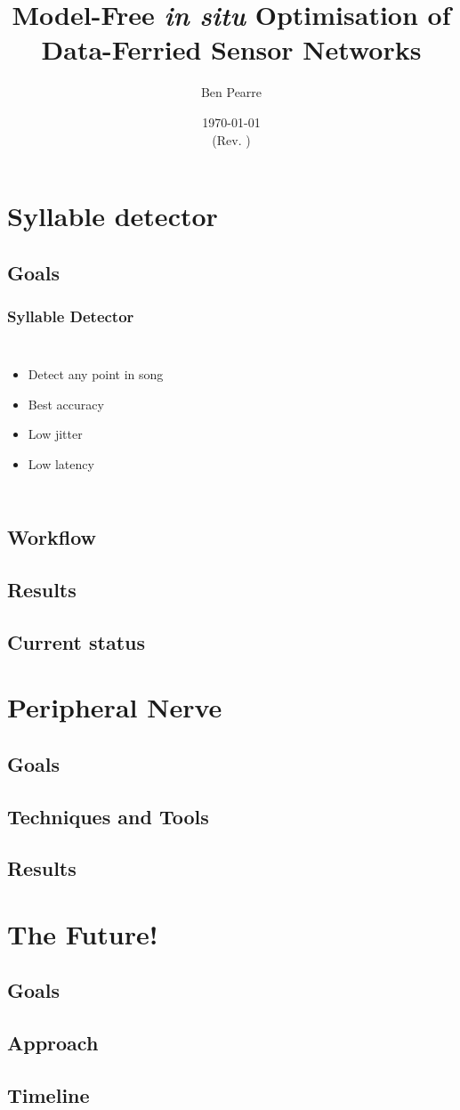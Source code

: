 \documentclass{beamer}
\title[Model-free Policy Optimisation for Data Ferries]{Model-Free {\em in situ\/} Optimisation of \\ Data-Ferried Sensor Networks}
\author{Ben Pearre}
\date{\today\\{\small (Rev. \svnrev)}}
\begin{document}
\begin{frame}
  \titlepage
\end{frame}

\section{Syllable detector}
\subsection{Goals}

\begin{frame}
\frametitle{Syllable Detector}
    \begin{columns}
	\column{5cm}
	\column{50mm}
	\begin{itemize}
	\item Detect any point in song
    	\item Best accuracy
    	\item Low jitter
    	\item Low latency
    	\end{itemize}
    	\end{columns}
        	\end{frame}

\subsection{Workflow}
\subsection{Results}
\subsection{Current status}


\section{Peripheral Nerve}
\subsection{Goals}
\subsection{Techniques and Tools}
\subsection{Results}



\section{The Future!}
\subsection{Goals}
\subsection{Approach}
\subsection{Timeline}
\end{document}
